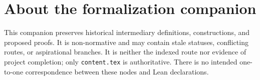
\chapter*{About the formalization companion}

This companion preserves historical intermediary definitions, constructions,
and proposed proofs.  It is non-normative and may contain stale statuses,
conflicting routes, or aspirational branches.  It is neither the indexed route
nor evidence of project completion; only \texttt{content.tex} is authoritative.
There is no intended one-to-one correspondence between these nodes and Lean
declarations.




















